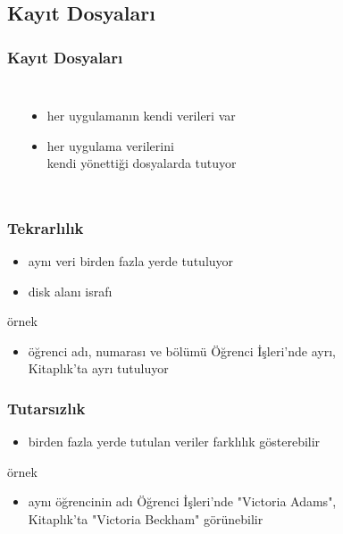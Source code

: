 \documentclass[dvipsnames]{beamer}
\theoremstyle{plain}
\begin{document}
\subsection{Kayıt Dosyaları}

\begin{frame}
  \frametitle{Kayıt Dosyaları}

  \begin{columns}[b]
    \begin{center}
    \end{center}

    \begin{itemize}
      \item her uygulamanın kendi verileri var
      \item her uygulama verilerini\\
	kendi yönettiği dosyalarda tutuyor
    \end{itemize}
  \end{columns}
\end{frame}


\begin{frame}
  \frametitle{Tekrarlılık}

  \begin{itemize}
    \item aynı veri birden fazla yerde tutuluyor
    \item disk alanı israfı
  \end{itemize}

 \medskip
  \begin{exampleblock}{örnek}
    \begin{itemize}
      \item öğrenci adı, numarası ve bölümü Öğrenci İşleri'nde ayrı,\\
	Kitaplık'ta ayrı tutuluyor
    \end{itemize}
  \end{exampleblock}
\end{frame}

\begin{frame}
  \frametitle{Tutarsızlık}

  \begin{itemize}
    \item birden fazla yerde tutulan veriler farklılık gösterebilir
  \end{itemize}

  \medskip
 \begin{exampleblock}{örnek}
    \begin{itemize}
      \item aynı öğrencinin adı Öğrenci İşleri'nde "Victoria Adams",\\
        Kitaplık'ta "Victoria Beckham" görünebilir
    \end{itemize}
  \end{exampleblock}
\end{frame}
\end{document}
